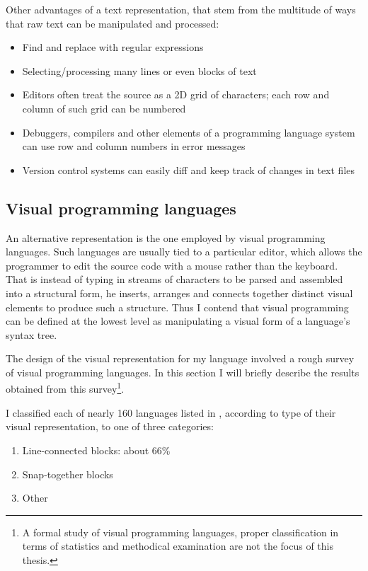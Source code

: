 Other advantages of a text representation, that stem from the multitude of ways that raw text can be manipulated and processed:
\begin{itemize}
	\item Find and replace with regular expressions
	\item Selecting/processing many lines or even blocks of text
	\item Editors often treat the source as a 2D grid of characters; each row and column of such grid can be numbered
	\item Debuggers, compilers and other elements of a programming language system can use row and column numbers in error messages
	\item Version control systems can easily diff and keep track of changes in text files
\end{itemize}


\subsection{Visual programming languages}
An alternative representation is the one employed by visual programming languages. Such languages are usually tied to a particular editor, which allows the programmer to edit the source code with a mouse rather than the keyboard. That is instead of typing in streams of characters to be parsed and assembled into a structural form, he inserts, arranges and connects together distinct visual elements to produce such a structure. Thus I contend that visual programming can be defined at the lowest level as manipulating a visual form of a language's syntax tree.

The design of the visual representation for my language involved a rough survey of visual programming languages. In this section I will briefly describe the results obtained from this survey\footnote{A formal study of visual programming languages, proper classification in terms of statistics and methodical examination are not the focus of this thesis.}.

I classified each of nearly 160 languages listed in \cite{snapshots}, according to type of their visual representation, to one of three categories:
\begin{enumerate}
    \item Line-connected blocks: about 66\%
    \item Snap-together blocks
    \item Other
\end{enumerate}

